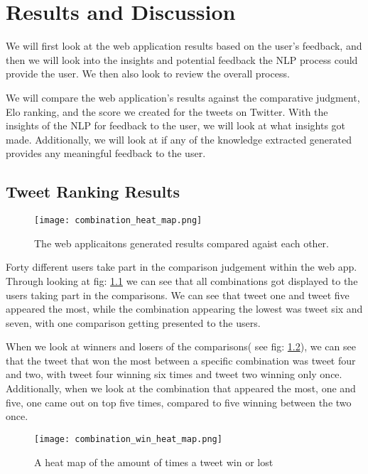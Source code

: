 \chapter{Results and Discussion}
\label{chap:results}

We will first look at the web application results based on the user's feedback, and then we will look into the insights and potential feedback the NLP process could provide the user. We then also look to review the overall process. 

We will compare the web application's results against the comparative judgment, Elo ranking, and the score we created for the tweets on Twitter. With the insights of the NLP for feedback to the user, we will look at what insights got made. Additionally, we will look at if any of the knowledge extracted generated provides any meaningful feedback to the user.



\section{Tweet Ranking Results} 
\label{sec:reaults_ranking}

	\begin{figure}[h]
		\centering
		\texttt{[image: combination\_heat\_map.png]}
		\caption{The web applicaitons generated results compared agaist each other.}
		\label{fig:combinations}
		
	\end{figure}
	
	Forty different users take part in the comparison judgement within the web app. Through looking at fig: \ref{fig:combinations} we can see that all combinations got displayed to the users taking part in the comparisons. We can see that tweet one and tweet five appeared the most, while the combination appearing the lowest was tweet six and seven, with one comparison getting presented to the users.
	
	
	
	When we look at winners and losers of the comparisons( see fig: \ref{fig:combination_wins}), we can see that the tweet that won the most between a specific combination was tweet four and two, with tweet four winning six times and tweet two winning only once. Additionally, when we look at the combination that appeared the most, one and five, one came out on top five times, compared to five winning between the two once.
	\begin{figure}[h]
		\centering
		\texttt{[image: combination\_win\_heat\_map.png]}
		\caption{A heat map of the amount of times a tweet win or lost}
		\label{fig:combination_wins}
		
	\end{figure}
	
